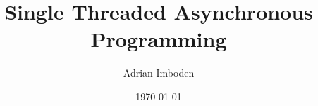 \documentclass{beamer}
\title[]{Single Threaded Asynchronous Programming}
\author{Adrian Imboden} %
\institute[] %
{
\smallskip\\
\textit{adi@thingdust.com}\\ %
\textit{adrian.imboden@komaxgroup.com} %
\medskip\\
\url{https://github.com/adrianimboden/cppusergroup-asynchronous-programming}\\
}
\date{\today} %
\begin{document}
\begin{frame}
\titlepage %
\end{frame}


\end{document}
